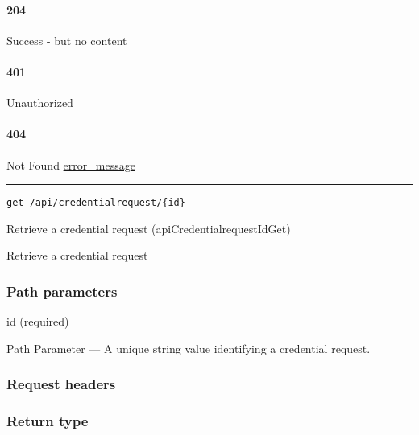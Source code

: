 \hypertarget{section-134}{%
\paragraph{204}\label{section-134}}

Success - but no content \protect\hyperlink{}{}

\hypertarget{section-135}{%
\paragraph{401}\label{section-135}}

Unauthorized \protect\hyperlink{}{}

\hypertarget{section-136}{%
\paragraph{404}\label{section-136}}

Not Found \protect\hyperlink{error_message}{error\_message}

\begin{center}\rule{0.5\linewidth}{\linethickness}\end{center}

\protect\hypertarget{apiCredentialrequestIdGet}{}{}

\begin{verbatim}
get /api/credentialrequest/{id}
\end{verbatim}

Retrieve a credential request ({apiCredentialrequestIdGet})

Retrieve a credential request

\hypertarget{path-parameters-22}{%
\subsubsection{Path parameters}\label{path-parameters-22}}

id (required)

{Path Parameter} --- A unique string value identifying a credential
request.

\hypertarget{request-headers-21}{%
\subsubsection{Request headers}\label{request-headers-21}}

\hypertarget{return-type-32}{%
\subsubsection{Return type}\label{return-type-32}}

